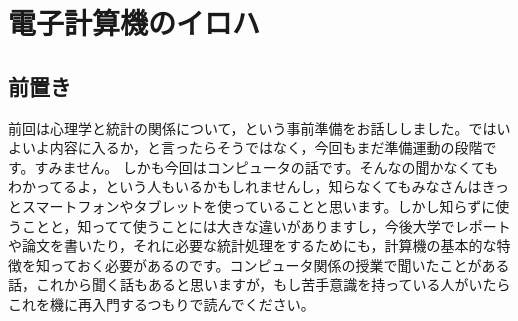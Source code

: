 \documentclass{ltjsbook}
\begin{document}
 
\chapter{電子計算機のイロハ} 
\label{chapter2} 

\section{前置き}
前回は心理学と統計の関係について，という事前準備をお話ししました。ではいよいよ内容に入るか，と言ったらそうではなく，今回もまだ準備運動の段階です。すみません。 しかも今回はコンピュータの話です。そんなの聞かなくてもわかってるよ，という人もいるかもしれませんし，知らなくてもみなさんはきっとスマートフォンやタブレットを使っていることと思います。しかし知らずに使うことと，知ってて使うことには大きな違いがありますし，今後大学でレポートや論文を書いたり，それに必要な統計処理をするためにも，計算機の基本的な特徴を知っておく必要があるのです。コンピュータ関係の授業で聞いたことがある話，これから聞く話もあると思いますが，もし苦手意識を持っている人がいたらこれを機に再入門するつもりで読んでください。
\end{document}
